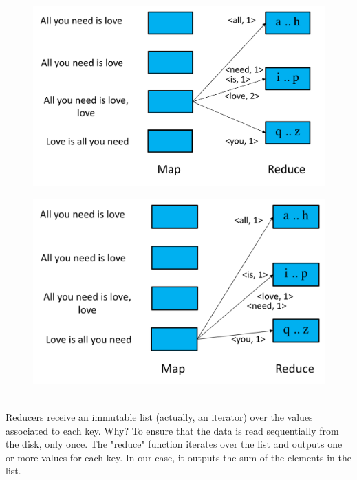 \documentclass[10pt,a4paper]{article}
\begin{document}
\begin{figure}[h!]
\centering
\begin{minipage}{.5\textwidth}
  \centering
  \includegraphics[width=.6\linewidth]{images/map-example4.png}
  \label{fig:map-example4}
\end{minipage}%
\begin{minipage}{.5\textwidth}
  \centering
  \includegraphics[width=.6\linewidth]{images/map-example5.png}
  \label{fig:map-example5}
\end{minipage}
\end{figure}  \\
Reducers receive an immutable list (actually, an iterator) over the values associated to each key. Why? To ensure that the data is read sequentially from the disk, only once. The "reduce" function iterates over the list and outputs one or more values for each key. In our case, it outputs the sum of the elements in the list.
\end{document}
